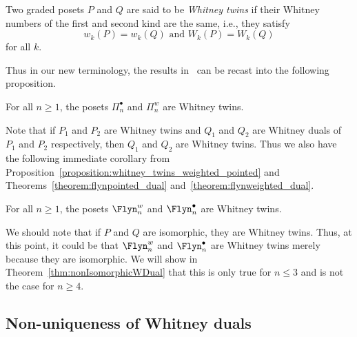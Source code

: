 \begin{defi}\label{definition:whitney_twins}
Two graded posets $P$ and $Q$  are said to be \emph{Whitney twins} if their Whitney numbers of the first and second kind are the same, i.e., they satisfy
$$w_k(P)=w_k(Q)\text{ and } W_k(P)=W_k(Q)$$
for all $k$.
\end{defi}

Thus in our new terminology, the results in~\cite{GonzalezDleonWachs2016} can be recast into the following proposition.

\begin{prop}  \label{proposition:whitney_twins_weighted_pointed} For all $n\ge 1$, the posets
$ \Pi_n^{\bullet}$ and $ \Pi_{n}^{w}$ are Whitney twins. 
 \end{prop}
 
Note that if $P_1$ and $P_2$ are Whitney twins and $Q_1$ and $Q_2$ are Whitney duals of $P_1$ and $P_2$ respectively, then $Q_1$ and $Q_2$ are Whitney twins.  Thus we also have the following immediate corollary from Proposition~\ref{proposition:whitney_twins_weighted_pointed} and Theorems~\ref{theorem:flynpointed_dual} and~\ref{theorem:flynweighted_dual}.

\begin{coro}\label{cor:pointedLynAndBicoloredAreWhitneyTwins}
For all $n\geq 1$, the posets $\Flyn_{n}^{w}$ and $\Flyn_{n}^{\bullet}$ are Whitney twins.
\end{coro}
We should note that if $P$ and $Q$ are isomorphic, they are  Whitney twins.  Thus, at this point, it could be that   $\Flyn_{n}^{w}$ and $\Flyn_{n}^{\bullet}$ are Whitney twins merely because they are isomorphic. We will show in Theorem~\ref{thm:nonIsomorphicWDual} that this is only true for $n\le 3$ and is not the case for $n\ge 4$.

\subsection{Non-uniqueness of Whitney duals}
  
